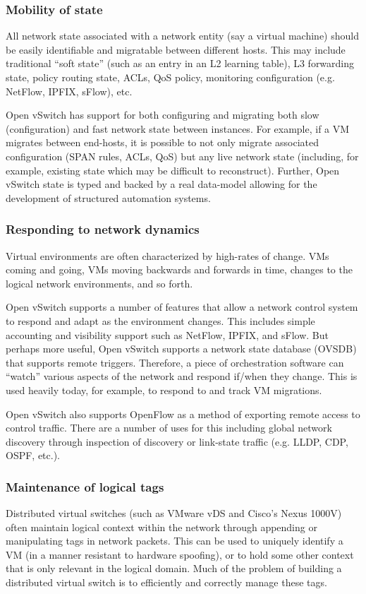 \documentclass[../sn.tex]{subfiles}
\begin{document}
\subsubsection{Mobility of state}
All network state associated with a network entity (say a virtual machine) should be easily identifiable and migratable between different hosts.
This may include traditional “soft state” (such as an entry in an L2 learning table), L3 forwarding state, policy routing state, ACLs, QoS policy, monitoring configuration (e.g. NetFlow, IPFIX, sFlow), etc.

Open vSwitch has support for both configuring and migrating both slow (configuration) and fast network state between instances.
For example, if a VM migrates between end-hosts, it is possible to not only migrate associated configuration (SPAN rules, ACLs, QoS) but any live network state (including, for example, existing state which may be difficult to reconstruct).
Further, Open vSwitch state is typed and backed by a real data-model allowing for the development of structured automation systems.

\subsubsection{Responding to network dynamics}
Virtual environments are often characterized by high-rates of change.
VMs coming and going, VMs moving backwards and forwards in time, changes to the logical network environments, and so forth.

Open vSwitch supports a number of features that allow a network control system to respond and adapt as the environment changes.
This includes simple accounting and visibility support such as NetFlow, IPFIX, and sFlow.
But perhaps more useful, Open vSwitch supports a network state database (OVSDB) that supports remote triggers.
Therefore, a piece of orchestration software can “watch” various aspects of the network and respond if/when they change.
This is used heavily today, for example, to respond to and track VM migrations.

Open vSwitch also supports OpenFlow as a method of exporting remote access to control traffic.
There are a number of uses for this including global network discovery through inspection of discovery or link-state traffic (e.g. LLDP, CDP, OSPF, etc.).

\subsubsection{Maintenance of logical tags}
Distributed virtual switches (such as VMware vDS and Cisco's Nexus 1000V) often maintain logical context within the network through appending or manipulating tags in network packets.
This can be used to uniquely identify a VM (in a manner resistant to hardware spoofing), or to hold some other context that is only relevant in the logical domain.
Much of the problem of building a distributed virtual switch is to efficiently and correctly manage these tags.
\end{document}
